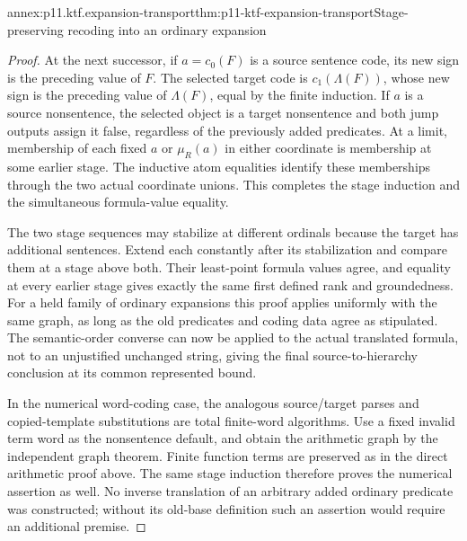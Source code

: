 \begin{annexitem}{annex:p11.ktf.expansion-transport}{thm:p11-ktf-expansion-transport}{Stage-preserving recoding into an ordinary expansion}
\begin{proof}
At the next successor, if \(a=c_0(F)\) is a source sentence
code, its new sign is the preceding value of \(F\). The selected
target code is \(c_1(\Lambda(F))\), whose new sign is the
preceding value of \(\Lambda(F)\), equal by the finite induction.
If \(a\) is a source nonsentence, the selected object is a
target nonsentence and both jump outputs assign it false, regardless
of the previously added predicates. At a limit, membership of each
fixed \(a\) or \(\mu_R(a)\) in either coordinate is membership
at some earlier stage. The inductive atom equalities identify these
memberships through the two actual coordinate unions. This completes
the stage induction and the simultaneous formula-value equality.

The two stage sequences may stabilize at different ordinals because
the target has additional sentences. Extend each constantly after its
stabilization and compare them at a stage above both. Their least-point
formula values agree, and equality at every earlier stage gives exactly
the same first defined rank and groundedness. For a held family of
ordinary expansions this proof applies uniformly with the same graph,
as long as the old predicates and coding data agree as stipulated.
The semantic-order converse can now be applied to the actual translated
formula, not to an unjustified unchanged string, giving the final
source-to-hierarchy conclusion at its common represented bound.

In the numerical word-coding case, the analogous source/target parses
and copied-template substitutions are total finite-word algorithms.
Use a fixed invalid term word as the nonsentence default, and obtain
the arithmetic graph by the independent graph theorem. Finite function
terms are preserved as in the direct arithmetic proof above. The same
stage induction therefore proves the numerical assertion as well.
No inverse translation of an arbitrary added ordinary predicate was
constructed; without its old-base definition such an assertion would
require an additional premise.
\end{proof}
\end{annexitem}
